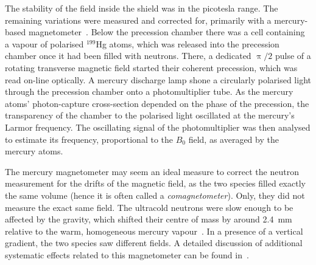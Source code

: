 The stability of the field inside the shield was in the picotesla range.
The remaining variations were measured and corrected for, primarily with a mercury-based magnetometer~\cite{FertlThesis,Komposch2017}.
Below the precession chamber there was a cell containing a vapour of polarised $^{199}$Hg atoms, which was released into the precession chamber once it had been filled with neutrons.
There, a dedicated $\uppi/2$ pulse of a rotating transverse magnetic field started their coherent precession, which was read on-line optically.
A mercury discharge lamp shone a circularly polarised light through the precession chamber onto a photomultiplier tube.
As the mercury atoms' photon-capture cross-section depended on the phase of the precession, the transparency of the chamber to the polarised light oscillated at the mercury's Larmor frequency.
The oscillating signal of the photomultiplier was then analysed to estimate its frequency, proportional to the $B_0$ field, as averaged by the mercury atoms.

The mercury magnetometer may seem an ideal measure to correct the neutron measurement for the drifts of the magnetic field, as the two species filled exactly the same volume (hence it is often called a \emph{comagnetometer}).
Only, they did not measure the exact same field.
The ultracold neutrons were slow enough to be affected by the gravity, which shifted their centre of mass by around \SI{2.4}{\milli\meter} relative to the warm, homogeneous mercury vapour~\cite{Afach2014magmoment}.
In a presence of a vertical gradient, the two species saw different fields.
A detailed discussion of additional systematic effects related to this magnetometer can be found in~\cite{Afach2014magmoment}.

